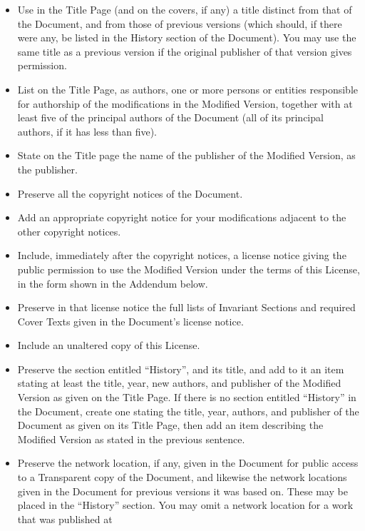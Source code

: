 \begin{itemize}

\item Use in the Title Page (and on the covers, if any) a title distinct
   from that of the Document, and from those of previous versions
   (which should, if there were any, be listed in the History section
   of the Document).  You may use the same title as a previous version
   if the original publisher of that version gives permission.
\item List on the Title Page, as authors, one or more persons or entities
   responsible for authorship of the modifications in the Modified
   Version, together with at least five of the principal authors of the
   Document (all of its principal authors, if it has less than five).
\item State on the Title page the name of the publisher of the
   Modified Version, as the publisher.
\item Preserve all the copyright notices of the Document.
\item Add an appropriate copyright notice for your modifications
   adjacent to the other copyright notices.
\item Include, immediately after the copyright notices, a license notice
   giving the public permission to use the Modified Version under the
   terms of this License, in the form shown in the Addendum below.
\item Preserve in that license notice the full lists of Invariant Sections
   and required Cover Texts given in the Document's license notice.
\item Include an unaltered copy of this License.
\item Preserve the section entitled ``History'', and its title, and add to
   it an item stating at least the title, year, new authors, and
   publisher of the Modified Version as given on the Title Page.  If
   there is no section entitled ``History'' in the Document, create one
   stating the title, year, authors, and publisher of the Document as
   given on its Title Page, then add an item describing the Modified
   Version as stated in the previous sentence.
\item Preserve the network location, if any, given in the Document for
   public access to a Transparent copy of the Document, and likewise
   the network locations given in the Document for previous versions
   it was based on.  These may be placed in the ``History'' section.
   You may omit a network location for a work that was published at

\end{itemize}
